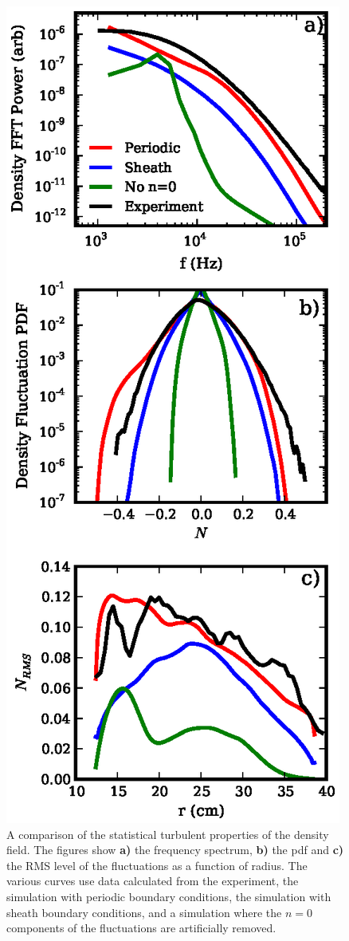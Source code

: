 \documentclass[showpacs,preprintnumbers,amsmath,amssymb,superscriptaddress,aip]{revtex4-1}
\begin{document}
\begin{figure}[!htbp]
\includegraphics[]{statistics}
\hfil
\caption{A comparison of the statistical turbulent properties of the density field. The figures show \textbf{a)} the frequency spectrum, \textbf{b)} the pdf and \textbf{c)} the RMS level
of the fluctuations as a function of radius. The various curves use data calculated from the experiment, the simulation with periodic boundary conditions, the simulation with sheath
boundary conditions, and a simulation where the $n=0$ components of the fluctuations are artificially removed.}
\label{statistics}
\end{figure}
\end{document}

